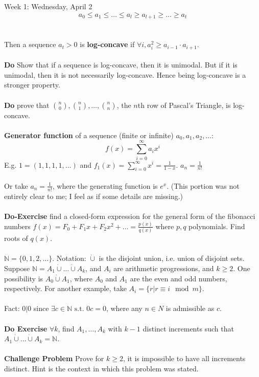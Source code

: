 \documentclass[12pt]{article}
\theoremstyle{remark}
\newcommand{\N}{\mathbb{N}}
\newcommand{\st}{\text{ s.t. }}
\begin{document}
\begin{section}{Week 1: Wednesday, April 2}
$$a_0 \leq a_1 \leq \ldots \leq a_l \geq  a_{l+1} \geq \ldots \geq a_t$$
\\\\Then a sequence $a_t > 0$ is \textbf{log-concave} if $\forall i, a_i^2 \geq a_{i-1} \cdot a_{i+1}$.
\\\\\textbf{Do} Show that if a sequence is log-concave, then it is unimodal. But if it is unimodal, then it is not necessarily log-concave. Hence being log-concave is a stronger property. 
\\\\\textbf{Do} prove that ${n \choose 0},{n \choose 1},\ldots,{n \choose n}$, the $n$th row of Pascal's Triangle, is log-concave.
\\\\\textbf{Generator function} of a sequence (finite or infinite) $a_0,a_1,a_2,\ldots$:
$$f(x) = \sum_{i=0}^{\infty} a_i x^i$$
E.g. $1 = (1,1,1,1,\ldots)$ and $f_1(x) = \sum_{i=0}^{\infty} x^i = \frac{1}{1-x}$. $a_n = \frac{1}{n!}$\\\\Or take $a_n = \frac{1}{n!}$, where the generating function is $e^x$. (This portion was not entirely clear to me; I feel as if some details are missing.)
\\\\\textbf{Do-Exercise} find a closed-form expression for the general form of the fibonacci numbers $f(x) = F_0 + F_1x + F_2x^2 + \ldots = \frac{p(x)}{q(x)}$ where $p,q$ polynomials. Find roots of $q(x)$.
\\\\$\N = \{0,1,2,\ldots\}$. Notation: $\dot{\cup}$ is the disjoint union, i.e. union of disjoint sets. Suppose $\N = A_1 \dot{\cup} \ldots \dot{\cup} A_k$, and $A_i$ are arithmetic progressions, and $k \geq 2$. One possibility is $A_0 \dot{\cup} A_1$, where $A_0$ and $A_1$ are the even and odd numbers, respectively. For another example, take $A_i = \{r | r \equiv i \mod m\}$.
\\\\Fact: $0|0$ since $\exists c \in \N \st 0c = 0$, where any $n \in N$ is admissible as $c$.
\\\\\textbf{Do Exercise} $\forall k$, find $A_1,\ldots,A_k$ with $k-1$ distinct increments such that $A_1 \dot{\cup} \ldots \dot{\cup} A_k = \N$. 
\\\\\textbf{Challenge Problem} Prove for $k \geq 2$, it is impossible to have all increments distinct. Hint is the context in which this problem was stated.

\end{section}
\end{document}
